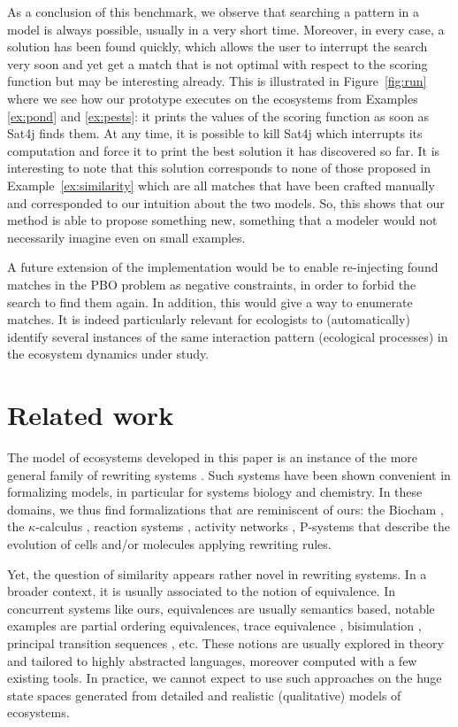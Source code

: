 \documentclass[a4paper,twoside]{article}
\begin{document}
As a conclusion of this benchmark, we observe that searching a pattern in a model is always possible, usually in a very short time.
Moreover, in every case, a solution has been found quickly, which allows the user to interrupt the search very soon and yet get a match that is not optimal with respect to the scoring function but may be interesting already.
This is illustrated in Figure~\ref{fig:run} where we see how our prototype executes on the ecosystems from Examples \ref{ex:pond} and \ref{ex:pests}: it prints the values of the scoring function as soon as Sat4j finds them. At any time, it is possible to kill Sat4j which interrupts its computation and force it to print the best solution it has discovered so far.
It is interesting to note that this solution corresponds to none of those proposed in Example~\ref{ex:similarity} which are all matches that have been crafted manually and corresponded to our intuition about the two models. So, this shows that our method is able to propose something new, \ie something that a modeler would not necessarily imagine even on small examples.



A future extension of the implementation would be to enable re-injecting found matches in the PBO problem as negative constraints, in order to forbid the search to find them again. 
In addition, this would give a way to enumerate matches.  
It is indeed particularly relevant for ecologists to (automatically) identify several instances of the same interaction pattern (ecological processes) in the ecosystem dynamics under study. 

\section{Related work}
\label{sec:related}

The model of ecosystems developed in this paper is an instance of the more general family of rewriting systems \cite{Terese03}. 
Such systems have been shown convenient in formalizing models, in particular for systems biology and chemistry. 
In these domains, we thus find formalizations that are reminiscent of ours: the Biocham \cite{Fages:2008:FCB:1786698.1786702}, the $\kappa$-calculus \cite{DBLP:journals/tcs/DanosL04}, reaction systems \cite{reactionsystems}, activity networks 
\cite{toxico2017}, P-systems
\cite{DBLP:journals/ijfcs/PaunPRS11}
that describe the evolution of cells and/or molecules applying rewriting rules.


Yet, the question of similarity appears rather novel in rewriting systems. In a broader context, it is usually associated to the notion of equivalence. In concurrent systems like ours, equivalences are usually semantics based,  notable examples are partial ordering equivalences, trace equivalence \cite{vanglabbek89}, bisimulation \cite{Sangiorgi:2011:IBC:2103603}, principal transition sequences \cite{DBLP:conf/otm/WangHWWHS10}, etc.  
These notions are usually explored in theory and tailored to highly abstracted languages, moreover computed with a few existing tools. 
In practice, we cannot expect to use such approaches on the huge state spaces generated from detailed and realistic (qualitative) models of ecosystems.   
\end{document}
